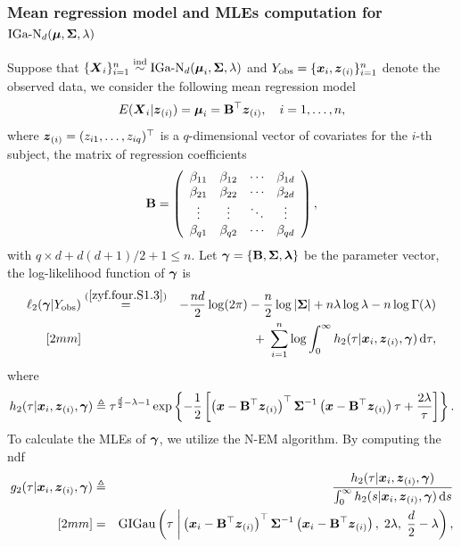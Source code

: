 \subsubsection{Mean regression model and MLEs computation for $\mbox{IGa-N}_d({\boldsymbol{\mu}}, {\mbox{\boldmath$\Sigma$}}, \lambda)$}\label{zyf.four.S.sec:IGaN}      %

Suppose that $\{{\boldsymbol{X}}_i\}_{i=1}^n \stackrel{{\rm ind}}{\sim} \mbox{IGa-N}_d({\boldsymbol{\mu}}_i, {\mbox{\boldmath$\Sigma$}}, \lambda)$ and $Y_{\rm obs} = \{{\boldsymbol{x}}_i, {\boldsymbol{z}}_{(i)}\}_{i=1}^n$ denote the observed data, we consider the following mean regression model
$$
    E({\boldsymbol{X}}_i | {\boldsymbol{z}}_{(i)}) = {\boldsymbol{\mu}}_i = {\bf B}^\top {\boldsymbol{z}}_{(i)}, \quad i = 1, \dots, n, 
$$
where ${\boldsymbol{z}}_{(i)} = (z_{i1}, \dots, z_{iq})^\top$ is a $q$-dimensional vector of covariates for the $i$-th subject, the matrix of regression coefficients
\begin{eqnarray*}
    {\bf B} = \left(
    \begin{array}{cccc}
        \beta_{11} & \beta_{12} & \cdots & \beta_{1d} \\ 
        \beta_{21} & \beta_{22} & \cdots & \beta_{2d} \\ 
        \vdots   & \vdots   & \ddots & \vdots   \\
        \beta_{q1} & \beta_{q2} & \cdots & \beta_{qd}
    \end{array}
    \right),
\end{eqnarray*}
with $q \times d + d(d + 1) / 2 + 1 \le n$. Let ${\boldsymbol{\gamma}} = \{ {\bf B}, {\mbox{\boldmath$\Sigma$}}, {\boldsymbol{\lambda}}\}$ be the parameter vector, the log-likelihood function of ${\boldsymbol{\gamma}}$ is
\begin{eqnarray*}
    \ell_2({\boldsymbol{\gamma}} | Y_{\rm obs}) &\stackrel{\rm (\ref{zyf.four.S1.3})}{=}& -\frac{nd}{2} \log(2\pi) - \frac{n}{2} \log|{\mbox{\boldmath$\Sigma$}}| + n\lambda\log\lambda - n \log\Gamma(\lambda) \\ [2mm]
    && +\; \sum_{i=1}^n \log \int_0^\infty h_2(\tau | {\boldsymbol{x}}_i, {\boldsymbol{z}}_{(i)}, {\boldsymbol{\gamma}}) \,\mbox{d} \tau,
\end{eqnarray*}
where 
$$
    h_2(\tau | {\boldsymbol{x}}_i, {\boldsymbol{z}}_{(i)}, {\boldsymbol{\gamma}}) \triangleq \tau^{\frac{d}{2} - \lambda - 1} \exp\left\{-\frac{1}{2}\left[\left({\boldsymbol{x}} - {\bf B}^\top {\boldsymbol{z}}_{(i)}\right)^\top {\mbox{\boldmath$\Sigma$}}^{-1} \left({\boldsymbol{x}} - {\bf B}^\top {\boldsymbol{z}}_{(i)}\right) \tau + \frac{2\lambda}{\tau} \right]\right\}.
$$
To calculate the MLEs of ${\boldsymbol{\gamma}}$, we utilize the N-EM algorithm. By computing the ndf
\begin{eqnarray*}
    g_2(\tau | {\boldsymbol{x}}_i, {\boldsymbol{z}}_{(i)}, {\boldsymbol{\gamma}}) &\triangleq& \frac{h_2(\tau | {\boldsymbol{x}}_i, {\boldsymbol{z}}_{(i)}, {\boldsymbol{\gamma}})}{\int_0^\infty h_2(s | {\boldsymbol{x}}_i, {\boldsymbol{z}}_{(i)}, {\boldsymbol{\gamma}}) \,\mbox{d} s} \\ [2mm]
    &=& \mbox{GIGau}\left( \tau \;\bigg| \left({\boldsymbol{x}}_i - {\bf B}^\top{\boldsymbol{z}}_{(i)}\right)^\top {\mbox{\boldmath$\Sigma$}}^{-1} \left({\boldsymbol{x}}_i - {\bf B}^\top {\boldsymbol{z}}_{(i)}\right),\; 2\lambda,\; \frac{d}{2} - \lambda \right),
\end{eqnarray*}
